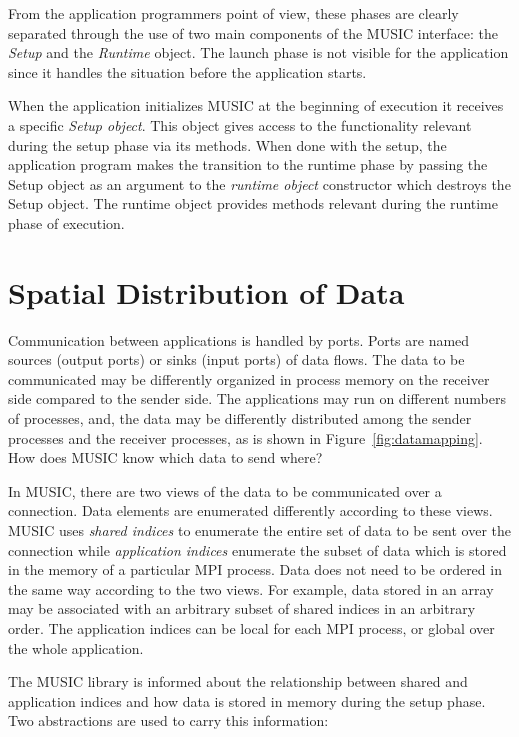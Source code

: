 \documentclass[a4paper,twoside]{report}
\begin{document}
From the application programmers point of view, these phases are
clearly separated through the use of two main components of the
MUSIC interface: the \emph{Setup} and the \emph{Runtime} object.  The
launch phase is not visible for the application since it handles the
situation before the application starts.

When the application initializes MUSIC at the beginning of execution
it receives a specific \emph{Setup object}.  This object gives access
to the functionality relevant during the setup phase via its methods.
When done with the setup, the application program makes the transition
to the runtime phase by passing the Setup object as an argument to the
\emph{runtime object} constructor which destroys the Setup object.
The runtime object provides methods relevant during the runtime phase
of execution.

\section{Spatial Distribution of Data}
\label{sec:spatialdist}

Communication between applications is handled by ports.  Ports are
named sources (output ports) or sinks (input ports) of data flows.
The data to be communicated may be differently organized in process
memory on the receiver side compared to the sender side.  The
applications may run on different numbers of processes, and, the data
may be differently distributed among the sender processes and the
receiver processes, as is shown in Figure~\ref{fig:datamapping}.  How
does MUSIC know which data to send where?

In MUSIC, there are two views of the data to be communicated over a
connection.  Data elements are enumerated differently according to
these views.  MUSIC uses \emph{shared indices} to
enumerate the entire set of data to be sent over the connection while
\emph{application indices} enumerate the
subset of data which is stored in the memory of a particular MPI
process.  Data does not need to be ordered in the same way according
to the two views.  For example, data stored in an array may be
associated with an arbitrary subset of shared indices in an arbitrary
order.  The application indices can be local for each MPI process, or
global over the whole application.

The MUSIC library is informed about the relationship between shared
and application indices and how data is stored in memory during the setup
phase.  Two abstractions are used to carry this information:
\end{document}
